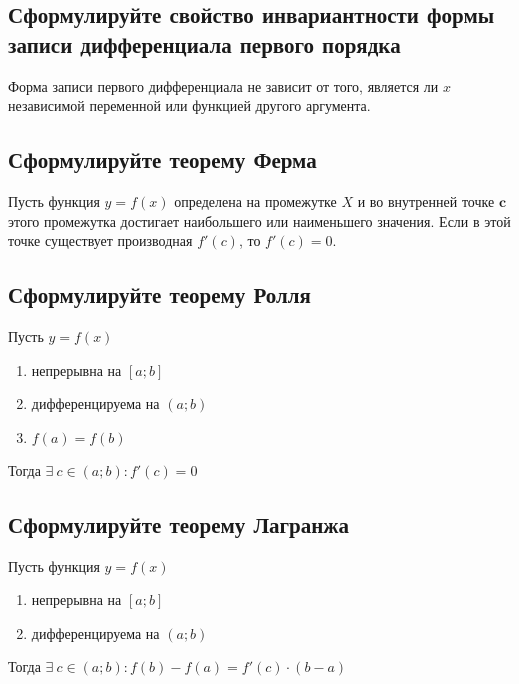 \subsection{Сформулируйте свойство инвариантности формы записи дифференциала первого порядка}
\begin{theorem}
	Форма записи первого дифференциала не зависит от того, является ли $x$ независимой переменной или функцией другого аргумента.
\end{theorem}

\subsection{Сформулируйте теорему Ферма}
\begin{theorem}
	Пусть функция $y=f(x)$ определена на промежутке $X$ и во внутренней точке $\bm{c}$ этого промежутка достигает наибольшего или наименьшего значения. Если в этой точке существует производная $f'(c)$, то $f'(c) = 0$.
\end{theorem}

\newpage
\subsection{Сформулируйте теорему Ролля}
\begin{theorem}
	Пусть $y=f(x)$
	\begin{enumerate}
		\item непрерывна на $[a;b]$
		\item дифференцируема на $(a;b)$
		\item $f(a) = f(b)$
	\end{enumerate}
	Тогда $\exists\ c \in (a;b)\colon f'(c) = 0$
\end{theorem}

\subsection{Сформулируйте теорему Лагранжа}
\begin{theorem}
	Пусть функция $y=f(x)$
	\begin{enumerate}
		\item непрерывна на $[a;b]$
		\item дифференцируема на $(a;b)$
	\end{enumerate}
	Тогда $\exists\ c \in (a;b)\colon \boxed{f(b) - f(a) = f'(c) \cdot (b-a)}$
\end{theorem}

